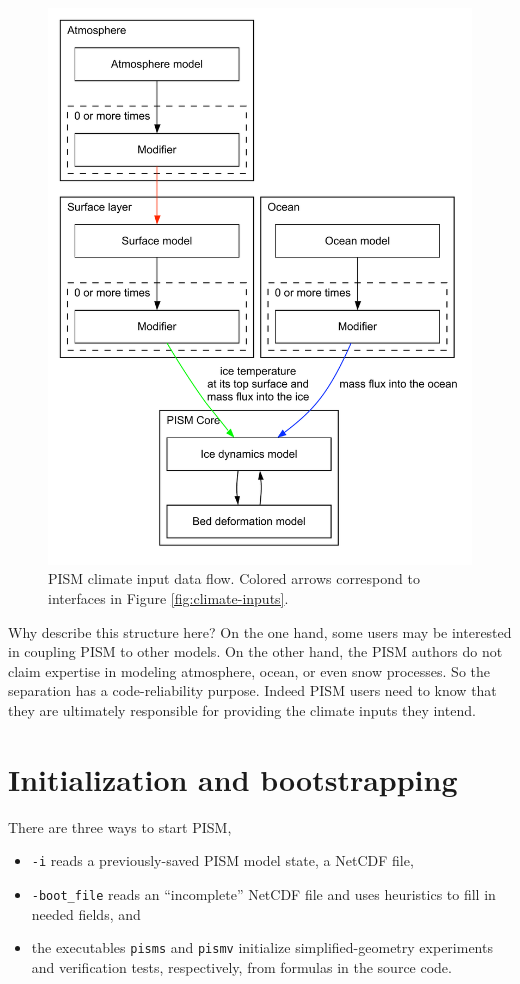 \begin{figure}
  \centering
  \includegraphics[width=5in]{figs/data-flow.pdf}
  \caption{PISM climate input data flow. Colored arrows correspond to interfaces in
    Figure \ref{fig:climate-inputs}.}
  \label{fig:climate-input-data-flow}
\end{figure}

Why describe this structure here? On the one hand, some users may be interested
in coupling PISM to other models. On the other hand, the PISM authors do not
claim expertise in modeling atmosphere, ocean, or even snow processes.   So the
separation has a code-reliability purpose. Indeed PISM users need to know that
they are ultimately responsible for providing the climate inputs they intend.

\clearpage
\newpage
\section{Initialization and bootstrapping}
\label{sec:boot}

There are three ways to start PISM,\begin{itemize}
\item \texttt{-i} reads a previously-saved PISM model state, a NetCDF file,
\item \texttt{-boot_file} reads an ``incomplete'' NetCDF file and uses heuristics to fill in needed fields, and
\item the executables \texttt{pisms} and \texttt{pismv} initialize simplified-geometry experiments and verification tests, respectively, from formulas in the source code.
\end{itemize}

